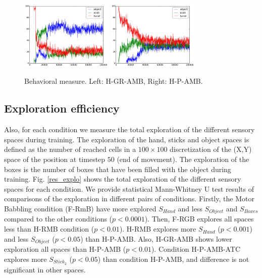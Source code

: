 \documentclass[10pt,letterpaper]{article}
\begin{document}
		\begin{figure}[ht]
			\centering
			\includegraphics[width=4.4cm]{./include/H-RGB-GR-AMB-log15-events-100000.pdf}
			\hspace{-0.4cm}
			\includegraphics[width=4.4cm]{./include/H-RGB-P-AMB-log8-events-100000.pdf}
			\caption{Behavioral measure. Left: H-GR-AMB, Right: H-P-AMB.}
			\label{res_ow}
		\end{figure}
		
	
	
	\subsection{Exploration efficiency}

		Also, for each condition we measure the total exploration of the different sensory spaces during training. 
		The exploration of the hand, sticks and object spaces is defined as the number of reached cells 
		in a $100\times100$ discretization of the (X,Y) space of the position at timestep $50$ (end of movement).
		The exploration of the boxes is the number of boxes that have been filled with the object during training.
		Fig. \ref{res_explo} shows the total exploration of the different sensory spaces for each condition.
		We provide statistical Mann-Whitney U test results of comparisons of the exploration in different pairs of conditions.
		Firstly, the Motor Babbling condition (F-RmB) have more explored $S_{Hand}$ and less $S_{Object}$ and $S_{Boxes}$ compared to the other conditions ($p<0.0001$).
		Then, F-RGB explores all spaces less than H-RMB condition ($p<0.01$).
		H-RMB explores more $S_{Hand}$ ($p<0.001$) and less $S_{Object}$ ($p<0.05$) than H-P-AMB.
		Also, H-GR-AMB shows lower exploration all spaces than H-P-AMB ($p<0.01$).
		Condition H-P-AMB-ATC explores more $S_{Stick_2}$ ($p<0.05$) than condition H-P-AMB, and difference is not significant in other spaces.
		
\end{document}
